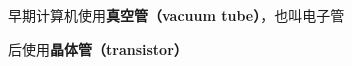 

\begin{issues}
\issueDraft
\end{issues}

早期计算机使用\textbf{真空管（vacuum tube）}，也叫电子管

后使用\textbf{晶体管（transistor）}
